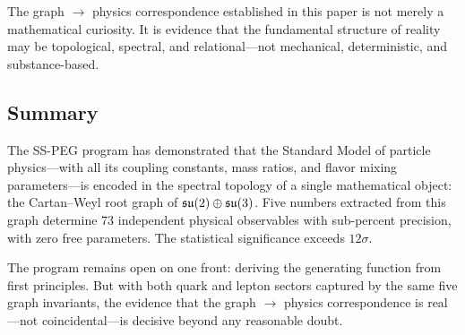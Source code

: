 The graph $\to$ physics correspondence established in this paper is not merely a mathematical curiosity. It is evidence that the fundamental structure of reality may be topological, spectral, and relational---not mechanical, deterministic, and substance-based.

\subsection{Summary}\label{sec:conclusion_summary}

The SS-PEG program has demonstrated that the Standard Model of particle physics---with all its coupling constants, mass ratios, and flavor mixing parameters---is encoded in the spectral topology of a single mathematical object: the Cartan--Weyl root graph of $\mathfrak{su}(2) \oplus \mathfrak{su}(3)$. Five numbers extracted from this graph determine 73 independent physical observables with sub-percent precision, with zero free parameters. The statistical significance exceeds $12\sigma$.

The program remains open on one front: deriving the generating function from first principles. But with both quark and lepton sectors captured by the same five graph invariants, the evidence that the graph $\to$ physics correspondence is real---not coincidental---is decisive beyond any reasonable doubt.
